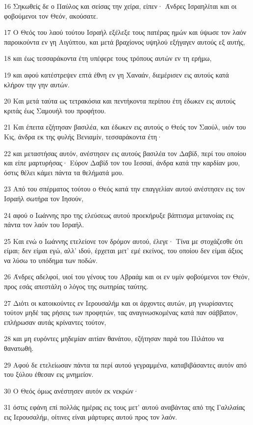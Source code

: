 \par 16 Σηκωθείς δε ο Παύλος και σείσας την χείρα, είπεν· Άνδρες Ισραηλίται και οι φοβούμενοι τον Θεόν, ακούσατε.
\par 17 Ο Θεός του λαού τούτου Ισραήλ εξέλεξε τους πατέρας ημών και ύψωσε τον λαόν παροικούντα εν γη Αιγύπτου, και μετά βραχίονος υψηλού εξήγαγεν αυτούς εξ αυτής,
\par 18 και έως τεσσαράκοντα έτη υπέφερε τους τρόπους αυτών εν τη ερήμω,
\par 19 και αφού κατέστρεψεν επτά έθνη εν γη Χαναάν, διεμέρισεν εις αυτούς κατά κλήρον την γην αυτών.
\par 20 Και μετά ταύτα ως τετρακόσια και πεντήκοντα περίπου έτη έδωκεν εις αυτούς κριτάς έως Σαμουήλ του προφήτου.
\par 21 Και έπειτα εζήτησαν βασιλέα, και έδωκεν εις αυτούς ο Θεός τον Σαούλ, υιόν του Κις, άνδρα εκ της φυλής Βενιαμίν, τεσσαράκοντα έτη·
\par 22 και μεταστήσας αυτόν, ανέστησεν εις αυτούς βασιλέα τον Δαβίδ, περί του οποίου και είπε μαρτυρήσας· Εύρον Δαβίδ τον του Ιεσσαί, άνδρα κατά την καρδίαν μου, όστις θέλει κάμει πάντα τα θελήματά μου.
\par 23 Από του σπέρματος τούτου ο Θεός κατά την επαγγελίαν αυτού ανέστησεν εις τον Ισραήλ σωτήρα τον Ιησούν,
\par 24 αφού ο Ιωάννης προ της ελεύσεως αυτού προεκήρυξε βάπτισμα μετανοίας εις πάντα τον λαόν του Ισραήλ.
\par 25 Και ενώ ο Ιωάννης ετελείονε τον δρόμον αυτού, έλεγε· Τίνα με στοχάζεσθε ότι είμαι; δεν είμαι εγώ, αλλ' ιδού, έρχεται μετ' εμέ εκείνος, του οποίου δεν είμαι άξιος να λύσω το υπόδημα των ποδών.
\par 26 Άνδρες αδελφοί, υιοί του γένους του Αβραάμ και οι εν υμίν φοβούμενοι τον Θεόν, προς εσάς απεστάλη ο λόγος της σωτηρίας ταύτης.
\par 27 Διότι οι κατοικούντες εν Ιερουσαλήμ και οι άρχοντες αυτών, μη γνωρίσαντες τούτον μηδέ τας ρήσεις των προφητών, τας αναγινωσκομένας κατά παν σάββατον, επλήρωσαν αυτάς κρίναντες τούτον,
\par 28 και μη ευρόντες μηδεμίαν αιτίαν θανάτου, εζήτησαν παρά του Πιλάτου να θανατωθή.
\par 29 Αφού δε ετελείωσαν πάντα τα περί αυτού γεγραμμένα, καταβιβάσαντες αυτόν από του ξύλου έθεσαν εις μνημείον.
\par 30 Ο Θεός όμως ανέστησεν αυτόν εκ νεκρών·
\par 31 όστις εφάνη επί πολλάς ημέρας εις τους μετ' αυτού αναβάντας από της Γαλιλαίας εις Ιερουσαλήμ, οίτινες είναι μάρτυρες αυτού προς τον λαόν.
